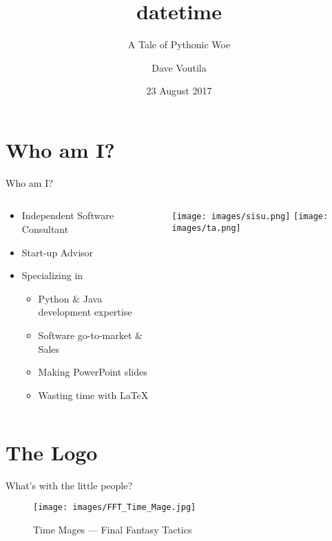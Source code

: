 \documentclass[10pt]{beamer}
\title[datetime]{datetime}
\subtitle{A Tale of Pythonic Woe}
\author{Dave Voutila}
\institute{
	voutilad@gmail.com \\
	https://github.com/voutilad \\
	@voutilad
}
\date{23 August 2017}
\newif\ifplacelogo %
\begin{document}
\maketitle

\section{Who am I?}
\begin{frame}{Who am I?}
	\begin{columns}
		\begin{column}{0.5 \textwidth}
			\begin{itemize}
				\item Independent Software Consultant
				\item Start-up Advisor
				\item Specializing in
					\begin{itemize}
						\item Python \& Java development expertise
						\item Software go-to-market \& Sales
						\item Making PowerPoint slides
						\item Wasting time with \LaTeX
					\end{itemize}
			\end{itemize}
		\end{column}
		\begin{column}{0.5 \textwidth}
			\centering
			\texttt{[image: images/sisu.png]}
			\vspace{1cm}
			\texttt{[image: images/ta.png]}
		\end{column}
	\end{columns}
\end{frame}

\placelogofalse
\section{The Logo}
\begin{frame}{What's with the little people?}
	\begin{figure}
		\centering
		\texttt{[image: images/FFT\_Time\_Mage.jpg]}
		\caption{Time Mages --- Final Fantasy Tactics}
	\end{figure}
\end{frame}

\placelogotrue
\end{document}
